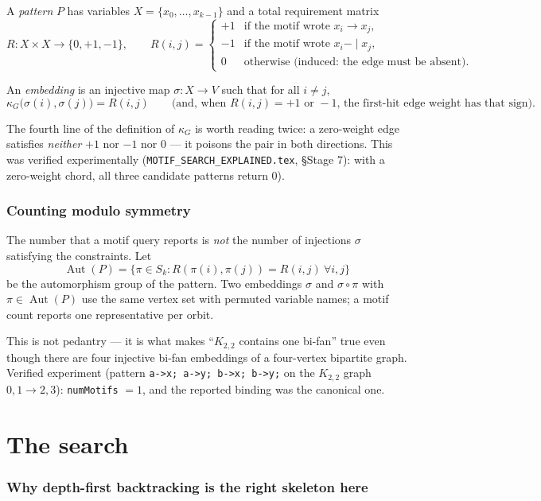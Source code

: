 \documentclass[11pt,a4paper]{article}
\newcommand{\code}[1]{\texttt{#1}}
\newcommand{\file}[1]{\texttt{#1}}
\newcommand{\Aut}{\operatorname{Aut}}
\begin{document}
A \emph{pattern} $P$ has variables $X=\{x_0,\dots,x_{k-1}\}$ and a total
requirement matrix
\[
  R : X\times X \to \{0,+1,-1\},
  \qquad
  R(i,j)=
  \begin{cases}
    +1 & \text{if the motif wrote } x_i\to x_j,\\
    -1 & \text{if the motif wrote } x_i\mathrel{-\mid} x_j,\\
    0 & \text{otherwise (induced: the edge must be absent).}
  \end{cases}
\]

An \emph{embedding} is an injective map $\sigma:X\to V$ such that for all
$i\ne j$,
\[
  \kappa_G\bigl(\sigma(i),\sigma(j)\bigr)=R(i,j)
  \qquad\text{(and, when }R(i,j)=+1\text{ or }-1\text{, the first-hit edge weight has that sign).}
\]

The fourth line of the definition of $\kappa_G$ is worth reading twice: a
zero-weight edge satisfies \emph{neither} $+1$ nor $-1$ nor $0$ --- it poisons the
pair in both directions. This was verified experimentally
(\file{MOTIF\_SEARCH\_EXPLAINED.tex}, \S Stage 7): with a zero-weight chord, all
three candidate patterns return $0$).

\section{Counting modulo symmetry}

The number that a motif query reports is \emph{not} the number of injections
$\sigma$ satisfying the constraints. Let
\[
  \Aut(P)=\{\pi\in S_k : R(\pi(i),\pi(j)) = R(i,j)\ \forall i,j\}
\]
be the automorphism group of the pattern. Two embeddings $\sigma$ and
$\sigma\circ\pi$ with $\pi\in\Aut(P)$ use the same vertex set with permuted
variable names; a motif count reports one representative per orbit.

This is not pedantry --- it is what makes ``$K_{2,2}$ contains one bi-fan'' true
even though there are four injective bi-fan embeddings of a four-vertex
bipartite graph. Verified experiment (pattern
\code{a->x; a->y; b->x; b->y;} on the $K_{2,2}$ graph $0,1\to 2,3$):
\code{numMotifs} $=1$, and the reported binding was the canonical one.

\part{The search}

\section{Why depth-first backtracking is the right skeleton here}
\end{document}
